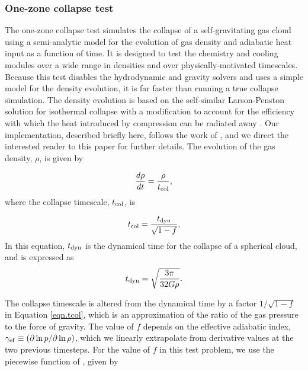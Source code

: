 \subsubsection{One-zone collapse test}
\label{sec.tests.1-zone}

The one-zone collapse test simulates the collapse of a
self-gravitating gas cloud using a semi-analytic model for the
evolution of gas density and adiabatic heat input as a function of
time.  It is designed to test the chemistry and cooling modules over a
wide range in densities and over physically-motivated timescales.
Because this test disables the hydrodynamic and gravity solvers and
uses a simple model for the density evolution, it is far faster than
running a true collapse simulation.  The density evolution is based on
the self-similar Larson-Penston solution for isothermal collapse
\citep{1969MNRAS.145..271L, 1969MNRAS.144..425P} with a modification
to account for the efficiency with which the heat introduced by
compression can be radiated away \citep{1983ApJ...265.1047Y}.  Our
implementation, described briefly here, follows the work of
\citet{2005ApJ...626..627O}, and we direct the interested reader to
this paper for further details.  The evolution of the gas density,
$\rho$, is given by

\begin{equation}
\frac{d\rho}{dt} = \frac{\rho}{t_{\rm col}},
\end{equation}
where the collapse timescale, $t_{\rm col}$, is

\begin{equation} \label{eqn.tcol}
t_{\rm col} = \frac{t_{\rm dyn}}{\sqrt{1 - f}},
\end{equation}
In this equation, $t_{\rm dyn}$ is the dynamical time for the collapse
of a spherical cloud, and is expressed as
\begin{equation}
t_{\rm dyn} = \sqrt{\frac{3 \pi}{32 G \rho}}.
\end{equation}

 The collapse timescale is altered from the dynamical time by a factor
$1/\sqrt{1-f}$ in Equation \ref{eqn.tcol}, which is an approximation
of the ratio of the gas pressure to the force of gravity.  The value
of $f$ depends on the effective adiabatic index, $\gamma_{\rm ef}
\equiv (\partial \ln p / \partial \ln \rho)$, which we linearly
extrapolate from derivative values at the two previous timesteps.  For
the value of $f$ in this test problem, we use the piecewise function
of \citet{2005ApJ...626..627O}, given by

